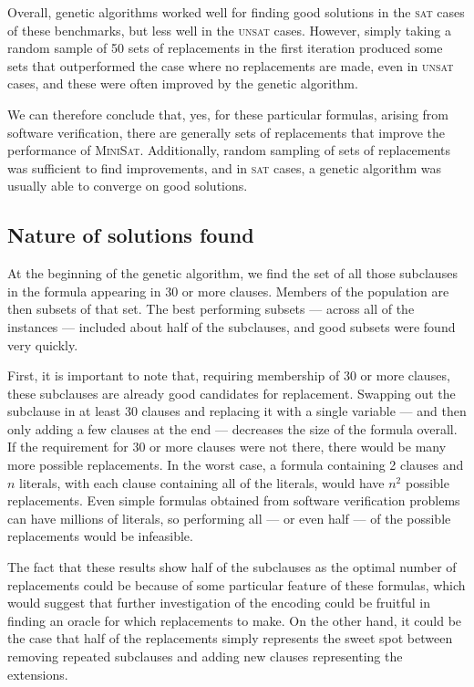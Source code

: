 \documentclass[proof,pdftex,11pt,a4,titlepage]{article}
\newcommand{\sat}{\textsc{sat}}
\newcommand{\unsat}{\textsc{unsat}}
\begin{document}
Overall, genetic algorithms worked well for finding good solutions in the \sat{} cases of these benchmarks, but less well in the \unsat{} cases. However, simply taking a random sample of 50 sets of replacements in the first iteration produced some sets that outperformed the case where no replacements are made, even in \unsat{} cases, and these were often improved by the genetic algorithm.

We can therefore conclude that, yes, for these particular formulas, arising from software verification, there are generally sets of replacements that improve the performance of \textsc{MiniSat}. Additionally, random sampling of sets of replacements was sufficient to find improvements, and in \sat{} cases, a genetic algorithm was usually able to converge on good solutions.

\subsection{Nature of solutions found}

At the beginning of the genetic algorithm, we find the set of all those subclauses in the formula appearing in 30 or more clauses. Members of the population are then subsets of that set. The best performing subsets --- across all of the instances --- included about half of the subclauses, and good subsets were found very quickly.

First, it is important to note that, requiring membership of 30 or more clauses, these subclauses are already good candidates for replacement. Swapping out the subclause in at least 30 clauses and replacing it with a single variable --- and then only adding a few clauses at the end --- decreases the size of the formula overall. If the requirement for 30 or more clauses were not there, there would be many more possible replacements. In the worst case, a formula containing 2 clauses and $n$ literals, with each clause containing all of the literals, would have $n^2$ possible replacements. Even simple formulas obtained from software verification problems can have millions of literals, so performing all --- or even half --- of the possible replacements would be infeasible.

The fact that these results show half of the subclauses as the optimal number of replacements could be because of some particular feature of these formulas, which would suggest that further investigation of the encoding could be fruitful in finding an oracle for which replacements to make. On the other hand, it could be the case that half of the replacements simply represents the sweet spot between removing repeated subclauses and adding new clauses representing the extensions.
\end{document}
